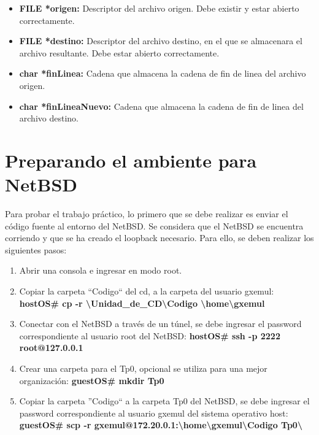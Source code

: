 \documentclass[a4paper,10pt]{article}
\begin{document}
  \begin{itemize}
  \item {\bf FILE *origen:}
    Descriptor del archivo origen. Debe existir y estar abierto correctamente.
  \item {\bf FILE *destino:}
    Descriptor del archivo destino, en el que se almacenara el archivo resultante. Debe estar abierto correctamente.
  \item {\bf char *finLinea:}
    Cadena que almacena la cadena de fin de linea del archivo origen.
  \item {\bf char *finLineaNuevo:}
    Cadena que almacena la cadena de fin de linea del archivo destino.
  \end{itemize}

\section{Preparando el ambiente para NetBSD}
  Para probar el trabajo pr\'actico, lo primero que se debe realizar es enviar el c\'odigo fuente al entorno
  del NetBSD. Se considera que el NetBSD se encuentra corriendo y que se ha creado el loopback necesario. Para ello, se deben realizar los siguientes pasos:
  \begin{enumerate}
   \item Abrir una consola e ingresar en modo root.
   \item Copiar la carpeta ``Codigo`` del cd, a la carpeta del usuario gxemul:
    \newline 
      {\bf hostOS\# cp -r \textbackslash Unidad\_de\_CD\textbackslash Codigo \textbackslash home\textbackslash gxemul}
   \item Conectar con el NetBSD a trav\'es de un t\'unel, se debe ingresar el password correspondiente al 
	 usuario root del NetBSD:
    \newline
      {\bf hostOS\# ssh -p 2222 root@127.0.0.1}
   \item Crear una carpeta para el Tp0, opcional se utiliza para una mejor organizaci\'on:
    \newline 
    {\bf guestOS\# mkdir Tp0}
   \item Copiar la carpeta ''Codigo`` a la carpeta Tp0 del NetBSD, se debe ingresar el password correspondiente al
         usuario gxemul del sistema operativo host:
   \newline
    {\bf guestOS\# scp -r gxemul@172.20.0.1:\textbackslash home\textbackslash gxemul\textbackslash Codigo \newline Tp0\textbackslash }
  \end{enumerate}
\end{document}
